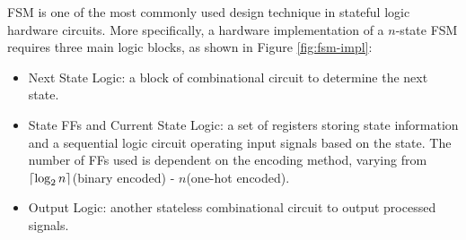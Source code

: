 \documentclass[a4paper]{report}
\DeclarePairedDelimiter\ceil{\lceil}{\rceil}
\begin{document}
FSM is one of the most commonly used design technique in stateful logic hardware circuits. More specifically, a hardware implementation of a $n$-state FSM requires three main logic blocks, as shown in Figure \ref{fig:fsm-impl}:
\begin{itemize}
    \item Next State Logic: a block of combinational circuit to determine the next state.
    \item State FFs and Current State Logic: a set of registers storing state information and a sequential logic circuit operating input signals based on the state. The number of FFs used is dependent on the encoding method, varying from $\ceil*{\log_2 n}$(binary encoded) - $n$(one-hot encoded).
    \item Output Logic: another stateless combinational circuit to output processed signals.
\end{itemize}
\end{document}

